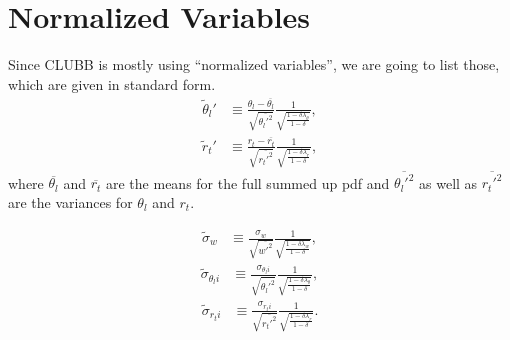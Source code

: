 \section{Normalized Variables}\label{sec:normvars}

Since \gls{CLUBB} is mostly using \enquote{normalized variables}, we are going to list those, which are given in standard form.
\begin{align}
    \tilde{\theta}_l'
    &\equiv \frac{\theta_l - \overline{\theta_l}}{\sqrt{\overline{\theta_l'^2}}}\frac{1}{\sqrt{\frac{1 - \delta \lambda_\theta}{1 - \delta}}}, \label{eq:theta_l_prime_tilde}
\end{align}
\begin{align}
    \tilde{r}_t'
    &\equiv \frac{r_t - \overline{r_t}}{\sqrt{\overline{r_t'^2}}}\frac{1}{\sqrt{\frac{1 - \delta \lambda_r}{1 - \delta}}}, \label{eq:r_t_prime_tilde}
\end{align}
where $\overline{\theta_l}$ and $\overline{r_t}$ are the means for the full summed up \gls{pdf} and $\overline{\theta_l'^2}$ as well as $\overline{r_t'^2}$ are the variances for $\theta_l$ and $r_t$.

\begin{align}
    \tilde{\sigma}_w
    &\equiv \frac{\sigma_w}{\sqrt{\overline{w'^2}}}
    \frac{1}{\sqrt{\frac{1-\delta\lambda_w}{1-\delta}}}, \label{eq:sigma_w_tilde}
\end{align}
\begin{align}
    \tilde{\sigma}_{\theta_l i}
    &\equiv \frac{\sigma_{\theta_l i}}{\sqrt{\overline{\theta_l'^2}}}
    \frac{1}{\sqrt{\frac{1-\delta\lambda_\theta}{1-\delta}}}, \label{eq:sigma_theta_l_i_tilde}
\end{align}
\begin{align}
    \tilde{\sigma}_{r_t i}
    &\equiv \frac{\sigma_{r_t i}}{\sqrt{\overline{r_t'^2}}}
    \frac{1}{\sqrt{\frac{1-\delta\lambda_r}{1-\delta}}}. \label{eq:sigma_r_t_i_tilde}
\end{align}